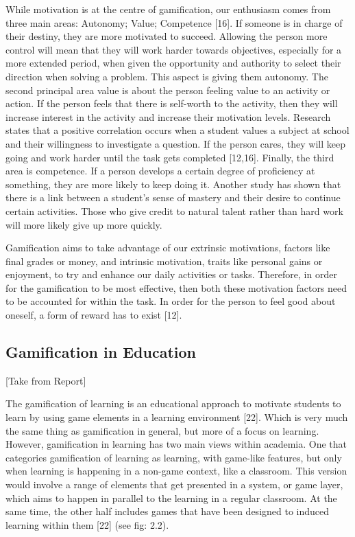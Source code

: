 \documentclass{sigchi}
\begin{document}
While motivation is at the centre of gamification, our enthusiasm comes from three main areas: Autonomy; Value; Competence [16]. If someone is in charge of their destiny, they are more motivated to succeed. Allowing the person more control will mean that they will work harder towards objectives, especially for a more extended period, when given the opportunity and authority to select their direction when solving a problem. This aspect is giving them autonomy. The second principal area value is about the person feeling value to an activity or action. If the person feels that there is self-worth to the activity, then they will increase interest in the activity and increase their motivation levels. Research states that a positive correlation occurs when a student values a subject at school and their willingness to investigate a question. If the person cares, they will keep going and work harder until the task gets completed [12,16]. Finally, the third area is competence. If a person develops a certain degree of proficiency at something, they are more likely to keep doing it. Another study has shown that there is a link between a student’s sense of mastery and their desire to continue certain activities. Those who give credit to natural talent rather than hard work will more likely give up more quickly. 

Gamification aims to take advantage of our extrinsic motivations, factors like final grades or money, and intrinsic motivation, traits like personal gains or enjoyment, to try and enhance our daily activities or tasks. Therefore, in order for the gamification to be most effective, then both these motivation factors need to be accounted for within the task. In order for the person to feel good about oneself, a form of reward has to exist [12]. 

\subsection{Gamification in Education}
[Take from Report]

The gamification of learning is an educational approach to motivate students to learn by using game elements in a learning environment [22]. Which is very much the same thing as gamification in general, but more of a focus on learning. However, gamification in learning has two main views within academia. One that categories gamification of learning as learning, with game-like features, but only when learning is happening in a non-game context, like a classroom. This version would involve a range of elements that get presented in a system, or game layer, which aims to happen in parallel to the learning in a regular classroom. At the same time, the other half includes games that have been designed to induced learning within them [22] (see fig: 2.2). 
\end{document}
